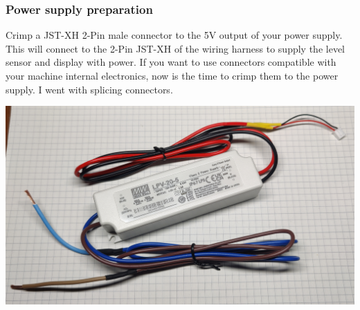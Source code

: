 \documentclass[]{article}
\begin{document}
\subsubsection{Power supply preparation}
\begin{minipage}[t]{0.5\linewidth}
	\vspace{0pt}
	Crimp a JST-XH 2-Pin male connector to the 5V output of your power supply. This will connect to the 2-Pin JST-XH of the wiring harness to supply the level sensor and display with power. If you want to use connectors compatible with your machine internal electronics, now is the time to crimp them to the power supply. I went with splicing connectors.
\end{minipage}
\hfill
\begin{minipage}[t]{0.4\linewidth}
	\vspace{0pt}
	\includegraphics[width=\linewidth]{images/02_wiring/07_psu.jpg}
\end{minipage}
\end{document}
